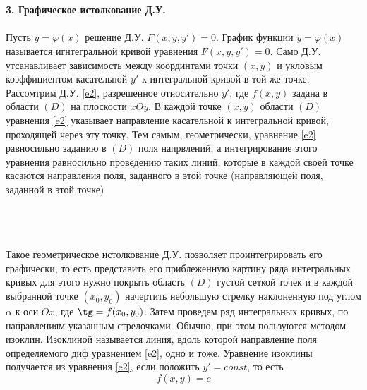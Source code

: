\documentclass{article}
\numberwithin{equation}{section}
\begin{document}
\\\\
\textbf{3. Графическое истолкование Д.У.}
\\\\
Пусть $y=\varphi(x)$ решение Д.У. $F(x,y,y')=0$. График функции $y=\varphi(x)$ называется игнтегральной кривой уравнения $F(x,y,y')=0$. Само Д.У. утсанавливает зависимость между координтами точки $(x,y)$ и укловым коэффициентом касательной $y'$ к интегральной кривой в той же точке. Рассомтрим Д.У. \ref{e2}, разрешенное относительно $y'$, где $f(x,y)$ задана в области $(D)$ на плоскости $xOy$. В каждой точке $(x,y)$ области $(D)$ уравнения \ref{e2} указывает направление касательной к интегральной кривой, проходящей через эту точку. Тем самым, геометрически, уравнение \ref{e2} равносильно заданию в $(D)$ поля напрвлений, а интегрирование этого уравнения равносильно проведению таких линий, которые в каждой своей точке касаются направления поля, заданного в этой точке (направляющей поля, заданной в этой точке)\\\\
\\\\
Такое геометрическое истолкование Д.У. позволяет проинтегрировать его графически, то есть представить его приблеженную картину ряда интегральных кривых для этого нужно покрыть область $(D)$ густой сеткой точек и в каждой выбранной точке $(x_0,y_0)$ начертить небольшую стрелку наклоненную под углом $\alpha$ к оси $Ox$, где $\tg=f(x_0,y_0)$. Затем проведем ряд интегральных кривых, по направлениям указанным стрелочками. Обычно, при этом пользуются методом изоклин. Изоклиной называется линия, вдоль которой направление поля определяемого диф уравнением \ref{e2}, одно и тоже. Уравнение изоклины получается из уравнения \ref{e2}, если положить $y'=const$, то есть
\begin{equation}\label{e6}
f(x,y)=c
\end{equation}
\end{document}
